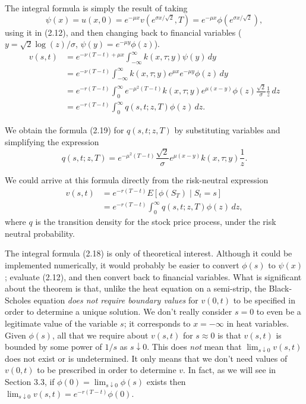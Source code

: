 The integral formula is simply the result of taking
\[
\psi(x) = u(x,0) = e^{-\mu x} v(e^{\sigma x / \sqrt{2}}, T) = e^{-\mu x} \phi(e^{\sigma x / \sqrt{2}}),
\]
using it in (2.12), and then changing back to financial variables (\(y = \sqrt{2} \log(z)/\sigma\), \(\psi(y) = e^{-\mu y} \phi(z)\)).
\begin{align*}
v(s,t) &= e^{-\nu (T-t) + \mu x} \int_{-\infty}^{\infty} k(x,\tau; y) \psi(y) \, dy \\
&= e^{-\nu (T-t)} \int_{-\infty}^{\infty} k(x,\tau; y) e^{\mu x} e^{-\mu y} \phi(z) \, dy \\
&= e^{-r(T-t)} \int_0^{\infty} e^{-\mu^2 (T-t)} k(x,\tau; y) e^{\mu (x-y)} \phi(z) \frac{\sqrt{2}}{\sigma} \frac{1}{z} \, dz \\
&= e^{-r(T-t)} \int_0^{\infty} q(s,t; z,T) \phi(z) \, dz.
\end{align*}

We obtain the formula (2.19) for \(q(s,t; z,T)\) by substituting variables and simplifying the expression
\[
q(s,t; z,T) = e^{-\mu^2 (T-t)} \frac{\sqrt{2}}{\sigma} e^{\mu (x-y)} k(x,\tau; y) \frac{1}{z}.
\]

We could arrive at this formula directly from the risk-neutral expression
\begin{align*}
v(s,t) &= e^{-r(T-t)} E[\phi(S_T) \mid S_t = s] \\
&= e^{-r(T-t)} \int_0^{\infty} q(s,t; z,T) \phi(z) \, dz,
\end{align*}
where \(q\) is the transition density for the stock price process, under the risk neutral probability.

The integral formula (2.18) is only of theoretical interest. Although it could be implemented numerically, it would probably be easier to convert \(\phi(s)\) to \(\psi(x)\); evaluate (2.12), and then convert back to financial variables. What is significant about the theorem is that, unlike the heat equation on a semi-strip, the Black-Scholes equation \textit{does not require boundary values} for \(v(0,t)\) to be specified in order to determine a unique solution. We don't really consider \(s = 0\) to even be a legitimate value of the variable \(s\); it corresponds to \(x = -\infty\) in heat variables. Given \(\phi(s)\), all that we require about \(v(s,t)\) for \(s \approx 0\) is that \(v(s,t)\) is bounded by some power of \(1/s\) as \(s \downarrow 0\). This does \textit{not} mean that \(\lim_{s \downarrow 0} v(s,t)\) does not exist or is undetermined. It only means that we don't need values of \(v(0,t)\) to be prescribed in order to determine \(v\). In fact, as we will see in Section 3.3, if \(\phi(0) = \lim_{s \downarrow 0} \phi(s)\) exists then \(\lim_{s \downarrow 0} v(s,t) = e^{-r(T-t)} \phi(0)\).

